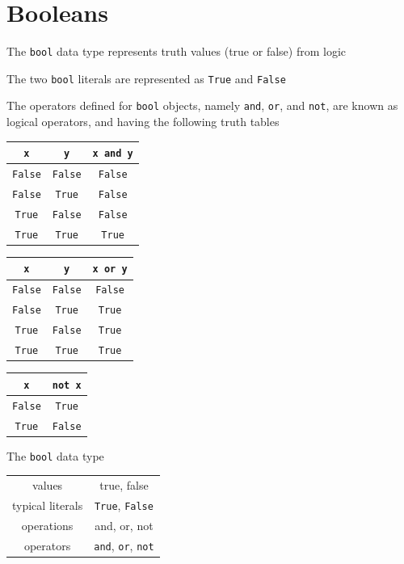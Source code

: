 \documentclass[8pt,a4paper,compress]{beamer}
\begin{document}
\section{Booleans}
\begin{frame}[fragile]
\pause

The \lstinline{bool} data type represents truth values (true or false) from logic 

\pause\bigskip

The two \lstinline{bool} literals are represented as \lstinline{True} and \lstinline{False}

\pause\bigskip

The operators defined for \lstinline{bool} objects, namely \lstinline{and}, \lstinline{or}, and \lstinline{not}, are known as logical operators, and having the following truth tables

\begin{center}
\begin{tabular}{cc|c}
\lstinline$x$ & \lstinline$y$ & \lstinline$x and y$ \\ \hline
\lstinline$False$ & \lstinline$False$ & \lstinline$False$ \\
\lstinline$False$ & \lstinline$True$ & \lstinline$False$ \\
\lstinline$True$ & \lstinline$False$ & \lstinline$False$ \\
\lstinline$True$ & \lstinline$True$ & \lstinline$True$
\end{tabular}\hspace{1cm} \begin{tabular}{cc|c}
\lstinline$x$ & \lstinline$y$ & \lstinline$x or y$ \\ \hline
\lstinline$False$ & \lstinline$False$ & \lstinline$False$ \\
\lstinline$False$ & \lstinline$True$ & \lstinline$True$ \\
\lstinline$True$ & \lstinline$False$ & \lstinline$True$ \\
\lstinline$True$ & \lstinline$True$ & \lstinline$True$
\end{tabular}\hspace{1cm} \begin{tabular}{c|c}
\lstinline$x$ & \lstinline$not x$ \\ \hline
\lstinline$False$ & \lstinline$True$ \\
\lstinline$True$ & \lstinline$False$
\end{tabular}
\end{center}

\pause\bigskip

The \lstinline{bool} data type

\begin{center}
\begin{tabular}{c|c}
values & true, false \\ 
typical literals & \lstinline$True$, \lstinline$False$ \\ 
operations & and, or, not \\
operators & \lstinline$and$, \lstinline$or$, \lstinline$not$
\end{tabular} 
\end{center}
\end{frame}
\end{document}
